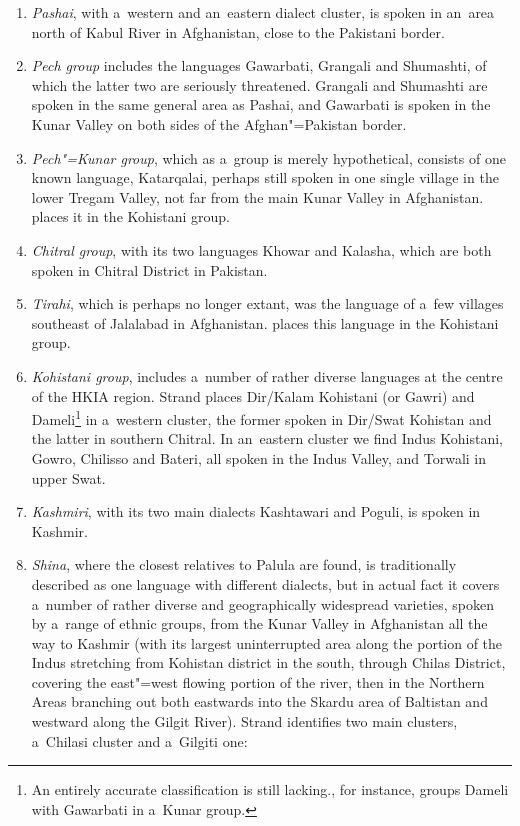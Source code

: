 \begin{enumerate}
\item \textit{Pashai}, with a~western and an~eastern dialect cluster, is spoken in an~area north of Kabul River in Afghanistan, close to the Pakistani border. 


\item \textit{Pech group} includes the languages Gawarbati, Grangali and Shumashti, of which the latter two are seriously threatened. Grangali and Shumashti are spoken in the same general area as Pashai, and Gawarbati is spoken in the Kunar Valley on both sides of the Afghan"=Pakistan border. 


\item \textit{Pech"=Kunar group}, which as a~group is merely hypothetical, consists of one known language, Katarqalai, perhaps still spoken in one single village in the lower Tregam Valley, not far from the main Kunar Valley in Afghanistan. \citet[825]{bashir2003} places it in the Kohistani group.


\item \textit{Chitral group}, with its two languages Khowar and Kalasha, which are both spoken in Chitral District in Pakistan.


\item \textit{Tirahi}, which is perhaps no longer extant, was the language of a~few villages southeast of Jalalabad in Afghanistan. \citet[824]{bashir2003} places this language in the Kohistani group.


\item \textit{Kohistani group}, includes a~number of rather diverse languages at the centre of the HKIA region. Strand places Dir/Kalam Kohistani (or Gawri) and Dameli\footnote{An entirely accurate classification is still lacking.\citet[824]{bashir2003}, for instance, groups Dameli with Gawarbati in a~Kunar group.} in a~western cluster, the former spoken in Dir/Swat Kohistan and the latter in southern Chitral. In an~eastern cluster we find Indus Kohistani, Gowro, Chilisso and Bateri, all spoken in the Indus Valley, and Torwali in upper Swat.


\item \textit{Kashmiri}, with its two main dialects Kashtawari and Poguli, is spoken in Kashmir. 


\item \textit{Shina}, where the closest relatives to Palula are found, is traditionally described as one language with different dialects, but in actual fact it covers a~number of rather diverse and geographically widespread varieties, spoken by a~range of ethnic groups, from the Kunar Valley in Afghanistan all the way to Kashmir (with its largest uninterrupted area along the portion of the Indus stretching from Kohistan district in the south, through Chilas District, covering the east"=west flowing portion of the river, then in the Northern Areas branching out both eastwards into the Skardu area of Baltistan and westward along the Gilgit River). Strand identifies two main clusters, a~Chilasi cluster and a~Gilgiti one:


\end{enumerate}
